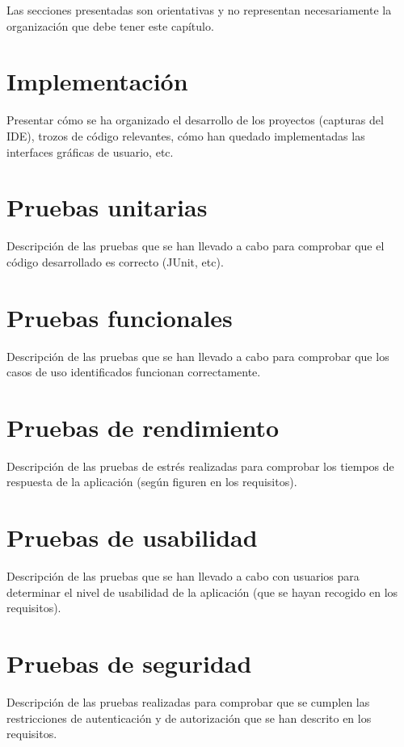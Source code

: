 Las secciones presentadas son orientativas y no representan
necesariamente la organización que debe tener este capítulo.
\section{Implementación}
Presentar cómo se ha organizado el desarrollo de los proyectos
(capturas del IDE), trozos de código relevantes, cómo han quedado
implementadas las interfaces gráficas de usuario, etc.
\section{Pruebas unitarias}
Descripción de las pruebas que se han llevado a cabo para comprobar que el código
desarrollado es correcto (JUnit, etc).
\section{Pruebas funcionales}
Descripción de las pruebas que se han llevado a cabo para comprobar que los casos de uso
identificados funcionan correctamente.
\section{Pruebas de rendimiento}
Descripción de las pruebas de estrés realizadas para comprobar los tiempos de
respuesta de la aplicación (según figuren en los requisitos).
\section{Pruebas de usabilidad}
Descripción de las pruebas que se han llevado a cabo con usuarios para determinar el
nivel de usabilidad de la aplicación (que se hayan recogido en los requisitos).
\section{Pruebas de seguridad}
Descripción de las pruebas realizadas para comprobar que se cumplen las
restricciones de autenticación y de autorización que se han descrito
en los requisitos.
